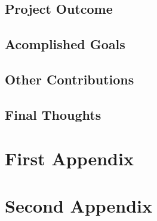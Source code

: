\documentclass[12pt,a4paper,oneside]{book}
\begin{document}
	\section{Project Outcome}
	\section{Acomplished Goals}
	\section{Other Contributions}
	\section{Final Thoughts}

\backmatter

\nocite{dpb,mrx05,mrx01}



\appendix

\chapter{First Appendix}
\chapter{Second Appendix}
\end{document}
